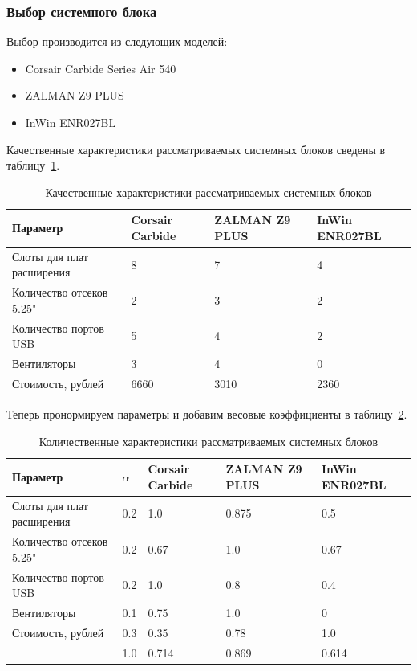 \documentclass[russian,utf8,emptystyle]{eskdtext}
\begin{document}
\subsubsection{Выбор системного блока}

Выбор производится из следующих моделей:
\begin{itemize}[label=-]
\item Corsair Carbide Series Air 540
\item ZALMAN Z9 PLUS
\item InWin ENR027BL
\end{itemize}

Качественные характеристики рассматриваемых системных блоков сведены в таблицу~\ref{tab:block-1}.

\begin{longtable}{p{7cm}|p{2cm}|p{2cm}|p{2cm}}
\caption{Качественные характеристики рассматриваемых системных блоков}
\label{tab:block-1} \\
Параметр                     & Corsair Carbide  & ZALMAN Z9 PLUS     & InWin ENR027BL \\ 
\hline 
Слоты для плат расширения    & 8                & 7                  & 4         \\ 
Количество отсеков 5.25"     & 2                & 3                  & 2         \\ 
Количество портов USB        & 5                & 4                  & 2         \\ 
Вентиляторы                  & 3                & 4                  & 0         \\ 
Стоимость, рублей            & 6660             & 3010               & 2360      \\
\end{longtable}

Теперь пронормируем параметры и добавим весовые коэффициенты в таблицу~\ref{tab:block-2}.

\begin{longtable}{p{7cm}|p{1cm}|p{2cm}|p{2cm}|p{2cm}}
\caption{Количественные характеристики рассматриваемых системных блоков}
\label{tab:block-2} \\
Параметр                     & $\alpha$ & Corsair Carbide  & ZALMAN Z9 PLUS     & InWin ENR027BL \\ 
\hline 
Слоты для плат расширения    & 0.2      & 1.0              & 0.875              & 0.5       \\ 
Количество отсеков 5.25"     & 0.2      & 0.67             & 1.0                & 0.67      \\ 
Количество портов USB        & 0.2      & 1.0              & 0.8                & 0.4       \\ 
Вентиляторы                  & 0.1      & 0.75             & 1.0                & 0         \\ 
Стоимость, рублей            & 0.3      & 0.35             & 0.78               & 1.0       \\
\hline
                             & 1.0      & 0.714            & 0.869              & 0.614
\end{longtable}
\end{document}
